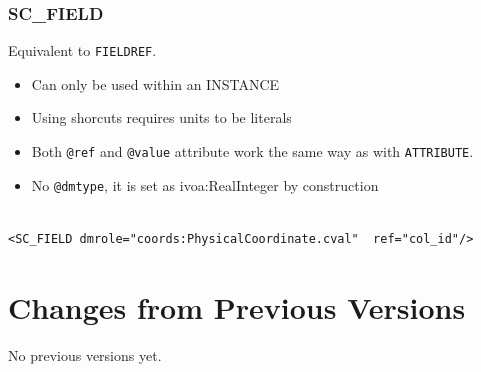 \documentclass[11pt,a4paper]{ivoa}
\begin{document}
\subsubsection{SC\_FIELD}
Equivalent to \texttt{FIELDREF}.


\begin{itemize}
    \item Can only be used within an INSTANCE        
    \item Using shorcuts requires units to be literals    
    \item Both \texttt{@ref} and \texttt{@value} attribute work the same way as with \texttt{ATTRIBUTE}.
    \item No \texttt{@dmtype},  it is set as ivoa:RealInteger by construction
 \end{itemize}


\begin{lstlisting}[caption={\texttt{ivoa:IntegerQuantity} example},style=XML,basicstyle=\small]

<SC_FIELD dmrole="coords:PhysicalCoordinate.cval"  ref="col_id"/>
\end{lstlisting}


\appendix

\section{Changes from Previous Versions}

No previous versions yet.  



\end{document}
